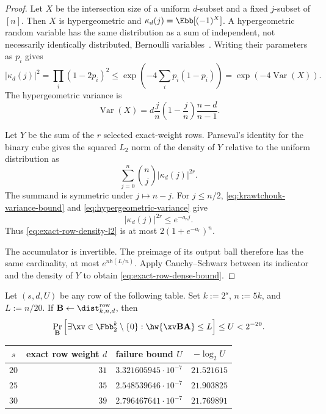 \begin{proof}
Let $X$ be the intersection size of a uniform $d$-subset and a fixed
$j$-subset of $[n]$.  Then $X$ is hypergeometric and
$\kappa_d(j)=\Ebb[(-1)^X]$.  A hypergeometric random variable has the same
distribution as a sum of independent, not necessarily identically
distributed, Bernoulli variables~\cite{HuiPark14}.  Writing their parameters
as $p_i$ gives
\begin{equation}
 |\kappa_d(j)|^2
 =\prod_i(1-2p_i)^2
 \leq\exp\left(-4\sum_i p_i(1-p_i)\right)
 =\exp\left(-4\operatorname{Var}(X)\right).
 \label{eq:krawtchouk-variance-bound}
\end{equation}
The hypergeometric variance is
\begin{equation}
 \operatorname{Var}(X)
 =d\frac{j}{n}\left(1-\frac{j}{n}\right)\frac{n-d}{n-1}.
 \label{eq:hypergeometric-variance}
\end{equation}

Let $Y$ be the sum of the $r$ selected exact-weight rows.  Parseval's identity
for the binary cube gives the squared $L_2$ norm of the density of $Y$ relative
to the uniform distribution as
\begin{equation}
 \sum_{j=0}^{n}\binom{n}{j}|\kappa_d(j)|^{2r}.
 \label{eq:exact-row-density-l2}
\end{equation}
The summand is symmetric under $j\mapsto n-j$.  For $j\leq n/2$,
\eqref{eq:krawtchouk-variance-bound} and
\eqref{eq:hypergeometric-variance} give
\begin{equation}
 |\kappa_d(j)|^{2r}\leq e^{-a_rj}.
 \label{eq:exact-row-eigenvalue-profile}
\end{equation}
Thus \eqref{eq:exact-row-density-l2} is at most
$2(1+e^{-a_r})^n$.

The accumulator is invertible.  The preimage of its output ball therefore has
the same cardinality, at most $e^{n\mathsf{h}(L/n)}$.  Apply Cauchy--Schwarz
between its indicator and the density of $Y$ to obtain
\eqref{eq:exact-row-dense-bound}.
\end{proof}

\begin{theorem}
\label{thm:ea-certified-exact-row}
Let $(s,d,U)$ be any row of the following table.  Set $k:=2^s$, $n:=5k$, and
$L:=n/20$.  If $\B\gets\dist^{\mathrm{row}}_{k,n,d}$, then
\begin{equation}
 \Pr_{\B}\left[
  \exists\xv\in\Fbb_2^k\setminus\{0\}:
  \hw{\xv\B\A}\leq L
 \right]\leq U<2^{-20}.
 \label{eq:ea-certified-exact-row-result}
\end{equation}
\begin{center}
\begin{tabular}{c|r|c|c}
$s$ & exact row weight $d$ & failure bound $U$ & $-\log_2 U$\\
\hline
$20$ & $31$ & $3.321605945\cdot10^{-7}$ & $21.521615$\\
$25$ & $35$ & $2.548539646\cdot10^{-7}$ & $21.903825$\\
$30$ & $39$ & $2.796467641\cdot10^{-7}$ & $21.769891$
\end{tabular}
\end{center}
\end{theorem}

